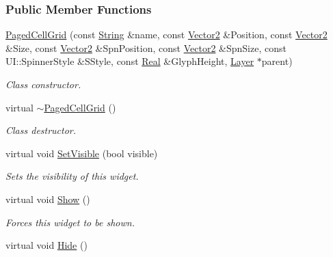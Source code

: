 \subsubsection*{Public Member Functions}
\begin{DoxyCompactItemize}
\item 
\hyperlink{classphys_1_1UI_1_1PagedCellGrid_a0b5ab33e9ec040898fc667682016003d}{PagedCellGrid} (const \hyperlink{namespacephys_aa03900411993de7fbfec4789bc1d392e}{String} \&name, const \hyperlink{classphys_1_1Vector2}{Vector2} \&Position, const \hyperlink{classphys_1_1Vector2}{Vector2} \&Size, const \hyperlink{classphys_1_1Vector2}{Vector2} \&SpnPosition, const \hyperlink{classphys_1_1Vector2}{Vector2} \&SpnSize, const UI::SpinnerStyle \&SStyle, const \hyperlink{namespacephys_af7eb897198d265b8e868f45240230d5f}{Real} \&GlyphHeight, \hyperlink{classphys_1_1UI_1_1Layer}{Layer} $\ast$parent)
\begin{DoxyCompactList}\small\item\em Class constructor. \item\end{DoxyCompactList}\item 
\hypertarget{classphys_1_1UI_1_1PagedCellGrid_a6b9c8876b41321b77321efcf27feb2c6}{
virtual \hyperlink{classphys_1_1UI_1_1PagedCellGrid_a6b9c8876b41321b77321efcf27feb2c6}{$\sim$PagedCellGrid} ()}
\label{classphys_1_1UI_1_1PagedCellGrid_a6b9c8876b41321b77321efcf27feb2c6}

\begin{DoxyCompactList}\small\item\em Class destructor. \item\end{DoxyCompactList}\item 
virtual void \hyperlink{classphys_1_1UI_1_1PagedCellGrid_a76ff4b649f4687203ba9d1473474ce99}{SetVisible} (bool visible)
\begin{DoxyCompactList}\small\item\em Sets the visibility of this widget. \item\end{DoxyCompactList}\item 
\hypertarget{classphys_1_1UI_1_1PagedCellGrid_aae7ae6fbe4d0fc1006c6abd8d1f22727}{
virtual void \hyperlink{classphys_1_1UI_1_1PagedCellGrid_aae7ae6fbe4d0fc1006c6abd8d1f22727}{Show} ()}
\label{classphys_1_1UI_1_1PagedCellGrid_aae7ae6fbe4d0fc1006c6abd8d1f22727}

\begin{DoxyCompactList}\small\item\em Forces this widget to be shown. \item\end{DoxyCompactList}\item 
\hypertarget{classphys_1_1UI_1_1PagedCellGrid_ae4cbcf05df48dfcb0871f4d3604010ec}{
virtual void \hyperlink{classphys_1_1UI_1_1PagedCellGrid_ae4cbcf05df48dfcb0871f4d3604010ec}{Hide} ()}
\label{classphys_1_1UI_1_1PagedCellGrid_ae4cbcf05df48dfcb0871f4d3604010ec}


\end{DoxyCompactItemize}
